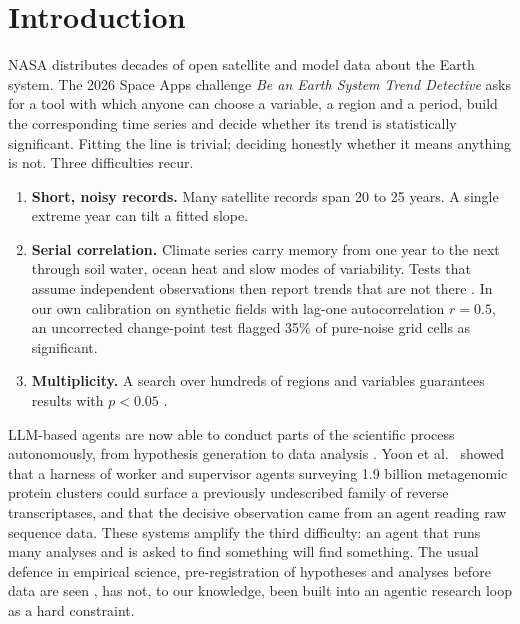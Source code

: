 \documentclass[11pt,a4paper]{article}
\begin{document}
\section{Introduction}

NASA distributes decades of open satellite and model data about the Earth system. The 2026 Space Apps challenge
\emph{Be an Earth System Trend Detective} asks for a tool with which anyone can choose a variable, a region and a
period, build the corresponding time series and decide whether its trend is statistically significant. Fitting the
line is trivial; deciding honestly whether it means anything is not. Three difficulties recur.

\begin{enumerate}
  \item \textbf{Short, noisy records.} Many satellite records span 20 to 25 years. A single extreme year can tilt a
        fitted slope.
  \item \textbf{Serial correlation.} Climate series carry memory from one year to the next through soil water, ocean
        heat and slow modes of variability. Tests that assume independent observations then report trends that are
        not there \citep{hamed1998,yue2002}. In our own calibration on synthetic fields with lag-one autocorrelation
        $r = 0.5$, an uncorrected change-point test flagged 35\% of pure-noise grid cells as significant.
  \item \textbf{Multiplicity.} A search over hundreds of regions and variables guarantees results with $p < 0.05$
        \citep{livezey1983,wilks2016,ioannidis2005}.
\end{enumerate}

LLM-based agents are now able to conduct parts of the scientific process autonomously, from hypothesis generation to
data analysis \citep{lu2024,gottweis2026,ghareeb2026,yoon2026}. Yoon et al.\ \citep{yoon2026} showed that a harness of
worker and supervisor agents surveying 1.9 billion metagenomic protein clusters could surface a previously
undescribed family of reverse transcriptases, and that the decisive observation came from an agent reading raw
sequence data. These systems amplify the third difficulty: an agent that runs many analyses and is asked to find
something will find something. The usual defence in empirical science, pre-registration of hypotheses and analyses
before data are seen \citep{nosek2018,simmons2011}, has not, to our knowledge, been built into an agentic research
loop as a hard constraint.
\end{document}
